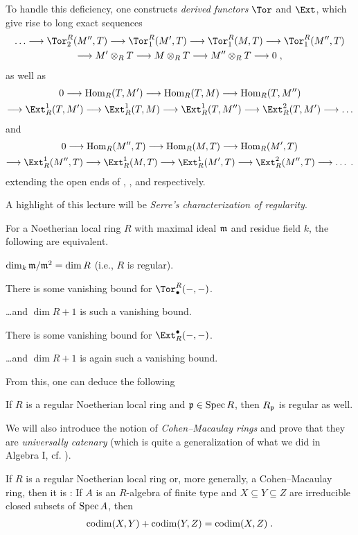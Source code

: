 \documentclass[a4paper,parskip=half,numbers=enddot, DIV=12]{scrreprt}
\begin{document}
To handle this deficiency, one constructs \emph{derived functors} $\Tor$ and $\Ext$, which give rise to long exact sequences
\begin{multline*}
	\ldots\morphism\Tor_2^R(M'',T)\morphism \Tor_1^R(M',T)\morphism \Tor_1^R(M,T)\morphism \Tor_1^R(M'',T)\\
	\morphism M'\otimes_RT\morphism M\otimes_RT\morphism M''\otimes_RT\morphism 0\;,
\end{multline*}
as well as
\begin{multline*}
	0\morphism\Hom_R(T,M')\morphism\Hom_R(T,M)\morphism\Hom_R(T,M'')\\
	\morphism\Ext_R^1(T,M')\morphism\Ext_R^1(T,M)\morphism\Ext_R^1(T,M'')\morphism\Ext_R^2(T,M')\morphism\ldots
\end{multline*}
and
\begin{multline*}
0\morphism\Hom_R(M'',T)\morphism\Hom_R(M,T)\morphism\Hom_R(M',T)\\
\morphism\Ext_R^1(M'',T)\morphism\Ext_R^1(M,T)\morphism\Ext_R^1(M',T)\morphism\Ext_R^2(M'',T)\morphism\ldots\;.
\end{multline*}
extending the open ends of , , and  respectively.

A highlight of this lecture will be \emph{Serre's characterization of regularity}.
\begin{thm*}
	For a  Noetherian local ring $R$ with maximal ideal $\mathfrak{m}$ and residue field $k$, the following are equivalent.
	\begin{alphanumerate}
		\item $\dim_k\mathfrak{m}/\mathfrak{m}^2=\dim R$ (i.e., $R$ is regular).
		\item There is some vanishing bound for $\Tor_\bullet ^R(-,-)$.
		\item \ldots and $\dim R+1$ is such a vanishing bound.
		\item There is some vanishing bound for $\Ext_R^\bullet (-,-)$.
		\item \ldots and $\dim R+1$ is again such a vanishing bound.
	\end{alphanumerate}
\end{thm*}
From this, one can deduce the following
\begin{cor*}
	If $R$ is a regular Noetherian local ring and $\mathfrak{p}\in\operatorname{Spec} R$, then $R_{\mathfrak{p}}$ is regular as well.
\end{cor*}

We will also introduce the notion of \emph{Cohen--Macaulay rings} and prove that they are \emph{universally catenary} (which is quite a generalization of what we did in Algebra I, cf. \cite[Theorem~10]{alg1}).
\begin{thm*}
	If $R$ is a regular Noetherian local ring or, more generally, a Cohen--Macaulay ring, then it is : If $A$ is an $R$-algebra of finite type and $X\subseteq Y\subseteq Z$ are irreducible closed subsets of $\operatorname{Spec} A$, then
	\begin{align*}
		\operatorname{codim}(X,Y)+\operatorname{codim}(Y,Z)=\operatorname{codim}(X,Z)\;.
	\end{align*}
\end{thm*}
\end{document}
